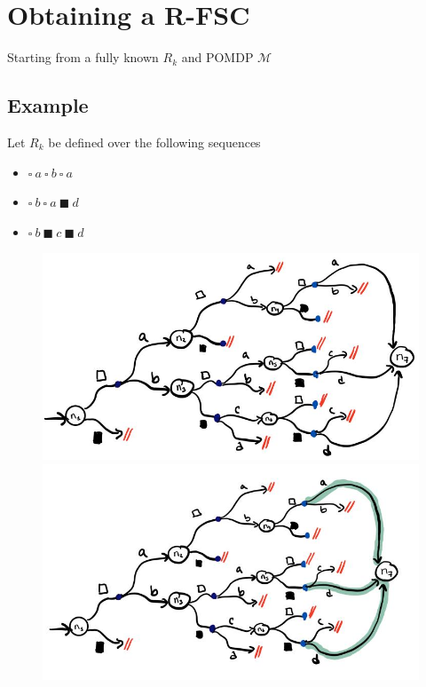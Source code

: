 \section{Obtaining a R-FSC}
Starting from a fully known $R_k$ and POMDP $\mathcal{M}$ 

\subsection*{Example}
Let $R_k$ be defined over the following sequences
\begin{itemize}
	\item $\square\ a\ \square\ b\ \square\ a$
	\item $\square\ b\ \square\ a\ \blacksquare\ d$
	\item $\square\ b\ \blacksquare\ c\ \blacksquare\ d$
\end{itemize}


\begin{figure}[H]
\centering
\includegraphics[width=\textwidth]{img/r-fsc1.PNG}
\includegraphics[width=\textwidth]{img/r-fsc2.PNG}
\end{figure}
